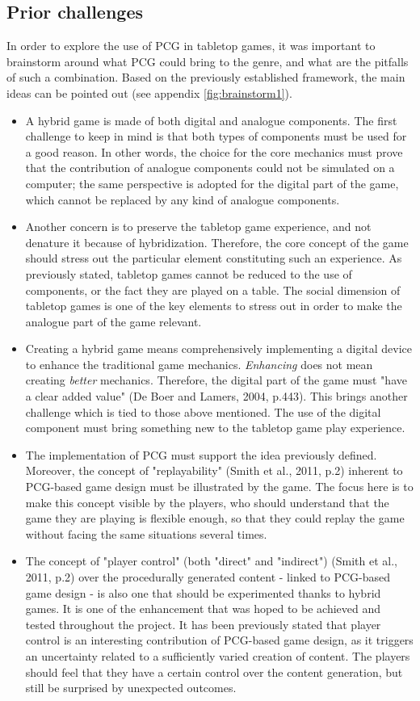 \subsection{Prior challenges}
In order to explore the use of PCG in tabletop games, it was important to brainstorm around what PCG could bring to the genre, and what are the pitfalls of such a combination. Based on the previously established framework, the main ideas can be pointed out (see appendix \ref{fig:brainstorm1}).
\begin{itemize}
\item A hybrid game is made of both digital and analogue components. The first challenge to keep in mind is that both types of components must be used for a good reason. In other words, the choice for the core mechanics must prove that the contribution of analogue components could not be simulated on a computer; the same perspective is adopted for the digital part of the game, which cannot be replaced by any kind of analogue components.  
\item Another concern is to preserve the tabletop game experience, and not denature it because of hybridization. Therefore, the core concept of the game should stress out the particular element constituting such an experience. As previously stated, tabletop games cannot be reduced to the use of components, or the fact they are played on a table. The social dimension of tabletop games is one of the key elements to stress out in order to make the analogue part of the game relevant.
\item Creating a hybrid game means comprehensively implementing a digital device to enhance the traditional game mechanics. \textit{Enhancing} does not mean creating \textit{better} mechanics. Therefore, the digital part of the game must "have a clear added value" (De Boer and Lamers, 2004, p.443)\cite{chap:aug}. This brings another challenge which is tied to those above mentioned. The use of the digital component must bring something new to the tabletop game play experience.
\item The implementation of PCG must support the idea previously defined. Moreover, the concept of "replayability" (Smith et al., 2011, p.2)\cite{pdf:pcgbased} inherent to PCG-based game design must be illustrated by the game. The focus here is to make this concept visible by the players, who should understand that the game they are playing is flexible enough, so that they could replay the game without facing the same situations several times.
\item The concept of "player control" (both "direct" and "indirect") (Smith et al., 2011, p.2)\cite{pdf:pcgbased} over the procedurally generated content - linked to PCG-based game design - is also one that should be experimented thanks to hybrid games. It is one of the enhancement that was hoped to be achieved and tested throughout the project. It has been previously stated that player control is an interesting contribution of PCG-based game design, as it triggers an uncertainty related to a sufficiently varied creation of content. The players should feel that they have a certain control over the content generation, but still be surprised by unexpected outcomes.

\end{itemize}
